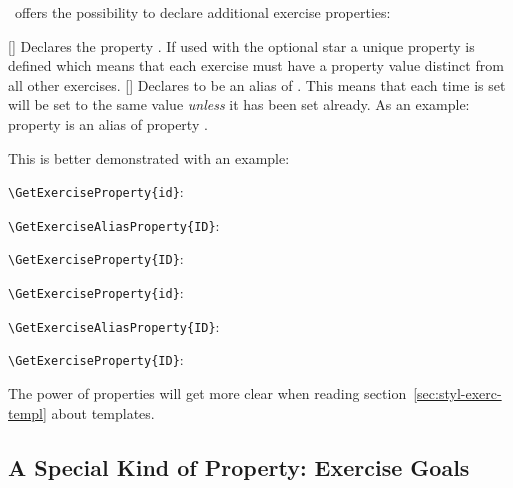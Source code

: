 \documentclass[load-preamble+]{cnltx-doc}
\begin{document}
\xsim\ offers the possibility to declare additional exercise properties:
\begin{commands}
  [\sarg{}]
    Declares the property .  If used with the optional star a
    unique property is defined which means that each exercise must have a
    property value distinct from all other exercises.
  []
    Declares  to be an alias of .  This
    means that each time  is set  will be
    set to the same value \emph{unless} it has been set already.  As an
    example: property  is an alias of property .
\end{commands}

This is better demonstrated with an example:
\begin{example}[outside]
  \begin{exercise}
    \lipsum[4] %
    \verb+\GetExerciseProperty{id}+:  \par
    \verb+\GetExerciseAliasProperty{ID}+:  \par
    \verb+\GetExerciseProperty{ID}+: 
  \end{exercise}
  \begin{exercise}[ID=foo-bar]
    \lipsum[4]
    \verb+\GetExerciseProperty{id}+:  \par
    \verb+\GetExerciseAliasProperty{ID}+:  \par
    \verb+\GetExerciseProperty{ID}+: 
  \end{exercise}
\end{example}

The power of properties will get more clear when reading
section~\ref{sec:styl-exerc-templ} about templates.

\subsection{A Special Kind of Property: Exercise Goals}
\end{document}
